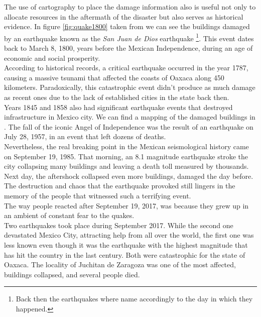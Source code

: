 The use of cartography to place the damage information also is useful not only to allocate resources in the aftermath of the disaster but also serves as historical evidence. In figure \ref{fig:quake1800} taken from \cite{AG3316} we can see the buildings damaged by an earthquake known as the \textit{San Juan de Dios} earthquake \footnote{Back then the earthquakes where name accordingly to the day in which they happened.}. This event dates back to March 8, 1800, years before the Mexican Independence, during an age of economic and social prosperity.\\

According to historical records, a critical earthquake occurred in the year 1787, causing a massive tsunami that affected the coasts of Oaxaca along 450 kilometers. Paradoxically, this catastrophic event didn't produce as much damage as recent ones due to the lack of established cities in the state back then.\\

Years 1845 and 1858 also had significant earthquake events that destroyed infrastructure in Mexico city. We can find a mapping of the damaged buildings in \cite{AG3316}. The fall of the iconic Angel of Independence was the result of an earthquake on July 28, 1957, in an event that left dozens of deaths.\\

Nevertheless, the real breaking point in the Mexican seismological history came on September 19, 1985. That morning, an 8.1 magnitude earthquake stroke the city collapsing many buildings and leaving a death toll measured by thousands. Next day, the aftershock collapsed even more buildings, damaged the day before. The destruction and chaos that the earthquake provoked still lingers in the memory of the people that witnessed such a terrifying event.\\

The way people reacted after September 19, 2017, was because they grew up in an ambient of constant fear to the quakes.\\

Two earthquakes took place during September 2017. While the second one devastated Mexico City, attracting help from all over the world, the first one was less known even though it was the earthquake with the highest magnitude that has hit the country in the last century. Both were catastrophic for the state of Oaxaca. The locality of Juchitan de Zaragoza was one of the most affected, buildings collapsed, and several people died.\\


